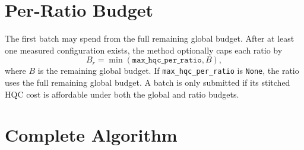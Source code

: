 \documentclass[11pt]{article}
\begin{document}
\section{Per-Ratio Budget}

The first batch may spend from the full remaining global budget. After at
least one measured configuration exists, the method optionally caps each ratio
by
\[
    B_r =
    \min(\texttt{max\_hqc\_per\_ratio}, B),
\]
where $B$ is the remaining global budget. If
\texttt{max\_hqc\_per\_ratio} is \texttt{None}, the ratio uses the full
remaining global budget. A batch is only submitted if its stitched HQC cost is
affordable under both the global and ratio budgets.

\section{Complete Algorithm}
\end{document}
